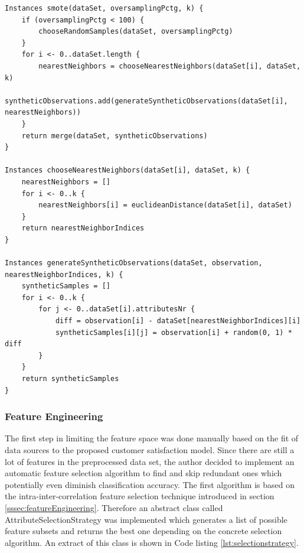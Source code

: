 \begin{lstlisting}[caption={SMOTE algorithm in pseudo code}, label={lst:smote}]
Instances smote(dataSet, oversamplingPctg, k) {
	if (oversamplingPctg < 100) {
		chooseRandomSamples(dataSet, oversamplingPctg)
	}
	for i <- 0..dataSet.length {
		nearestNeighbors = chooseNearestNeighbors(dataSet[i], dataSet, k)
		syntheticObservations.add(generateSyntheticObservations(dataSet[i], nearestNeighbors))
	}
	return merge(dataSet, syntheticObservations)
}

Instances chooseNearestNeighbors(dataSet[i], dataSet, k) {
	nearestNeighbors = []
	for i <- 0..k {
		nearestNeighbors[i] = euclideanDistance(dataSet[i], dataSet)
	}
	return nearestNeighborIndices
}

Instances generateSyntheticObservations(dataSet, observation, nearestNeighborIndices, k) {
	syntheticSamples = []
	for i <- 0..k {
		for j <- 0..dataSet[i].attributesNr {
			diff = observation[i] - dataSet[nearestNeighborIndices][i]
			syntheticSamples[i][j] = observation[i] + random(0, 1) * diff
		}
	}
	return syntheticSamples
}
\end{lstlisting}

\subsubsection{Feature Engineering}
The first step in limiting the feature space was done manually based on the fit of data sources to the proposed customer satisfaction model. Since there are still a lot of features in the preprocessed data set, the author decided to implement an automatic feature selection algorithm to find and skip redundant ones which potentially even diminish classification accuracy. The first algorithm is based on the intra-inter-correlation feature selection technique introduced in section \ref{sssec:featureEngineering}. Therefore an abstract class called AttributeSelectionStrategy was implemented which generates a list of possible feature subsets and returns the best one depending on the concrete selection algorithm. An extract of this class is shown in Code listing \ref{lst:selectionstrategy}.

